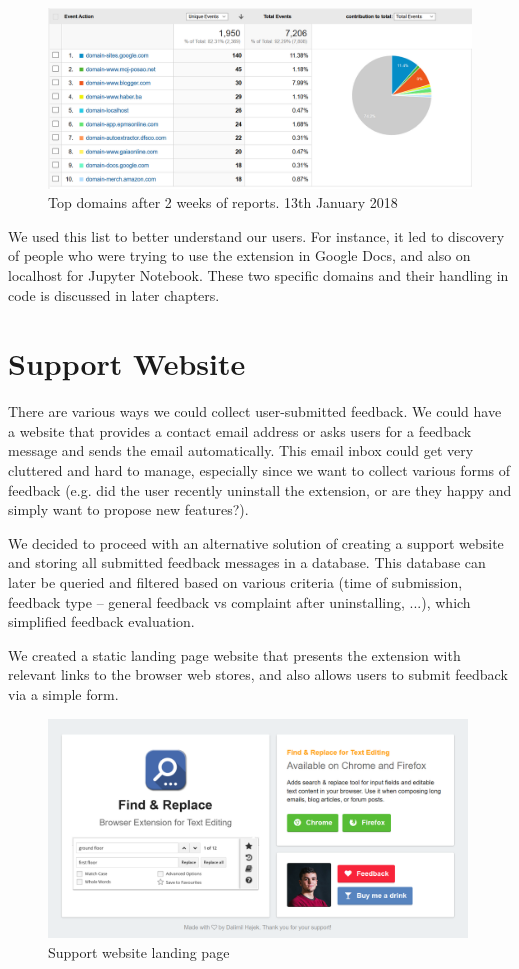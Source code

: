 \documentclass[bsc,frontabs,twoside,singlespacing,parskip,deptreport]{infthesis}
\begin{document}
\begin{figure}[h]
\centering
\includegraphics[width=1\textwidth]{../docs/top-domains.png}
\caption{Top domains after 2 weeks of reports. 13th January 2018}
\end{figure}

We used this list to better understand our users. For instance, it led to discovery of people who were trying to use the extension in Google Docs, and also on localhost for Jupyter Notebook. These two specific domains and their handling in code is discussed in later chapters.

\section{Support Website}
There are various ways we could collect user-submitted feedback. We could have a website that provides a contact email address or asks users for a feedback message and sends the email automatically. This email inbox could get very cluttered and hard to manage, especially since we want to collect various forms of feedback (e.g. did the user recently uninstall the extension, or are they happy and simply want to propose new features?). 

We decided to proceed with an alternative solution of creating a support website and storing all submitted feedback messages in a database. This database can later be queried and filtered based on various criteria (time of submission, feedback type -- general feedback vs complaint after uninstalling, ...), which simplified feedback evaluation.

We created a static landing page website that presents the extension with relevant links to the browser web stores, and also allows users to submit feedback via a simple form.

\begin{figure}[h]
\centering
\includegraphics[width=0.99\textwidth]{../graphics/landing-page.png}
\caption{Support website landing page}
\end{figure}
\end{document}
